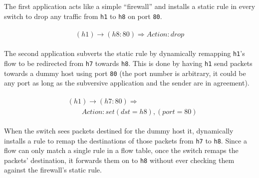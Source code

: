 The first application acts like a simple ``firewall'' and installs a static rule in every switch to drop any traffic from \texttt{h1} to \texttt{h8} on port \texttt{80}.

\begin{align}
\begin{aligned}
(h1) \rightarrow (h8:80) \Rightarrow Action: drop \nonumber
\end{aligned}
\end{align}

The second application subverts the static rule by dynamically remapping \texttt{h1}'s flow to be redirected from \texttt{h7} towards \texttt{h8}.
This is done by having \texttt{h1} send packets towards a dummy host using port \texttt{80} (the port number is arbitrary, it could be any port as long as the subversive application and the sender are in agreement).

\begin{align}
\begin{aligned}
&(h1) \rightarrow (h7:80) \Rightarrow  \\
    &\qquad Action: set (dst = h8), (port = 80) \nonumber
\end{aligned}
\end{align}

When the switch sees packets destined for the dummy host it, dynamically installs a rule to remap the destinations of those packets from \texttt{h7} to \texttt{h8}.
Since a flow can only match a single rule in a flow table, once the switch remaps the packets' destination, it forwards them on to \texttt{h8} without ever checking them against the firewall's static rule.


